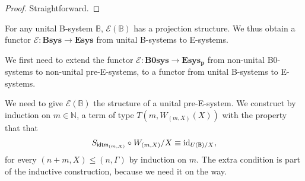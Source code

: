 \begin{proof}
Straightforward.
\end{proof}

\begin{defn}
For any unital B-system $\mathbb{B}$, $\mathcal{E}(\mathbb{B})$ has a
projection structure. We thus obtain a functor 
$\mathcal{E}:\mathbf{Bsys}\to\mathbf{Esys}$ from unital B-systems to E-systems.
\end{defn}

\begin{constr}
We first need to extend the functor $\mathcal{E}:\mathbf{B0sys}\to\mathbf{Esys_p}$
from non-unital B0-systems to non-unital pre-E-systems, to a functor from
unital B-systems to E-systems.

We need to give $\mathcal{E}(\mathbb{B})$ the structure of a unital
pre-E-system. We construct by induction on $m\in \mathbb{N}$, a term of type 
$T(m,W_{(m,X)}(X))$ with the property that that 
\begin{equation*}
S_{\tfid{(m,X)}}\circ W_{(m,X)}/X\jdeq\catid{U(\mathbb{B})/X},
\end{equation*} 
for every $(n+m,X)\leq (n,\Gamma)$ by induction on $m$. The extra
condition is part of the inductive construction, because we need it on the way.


\end{constr}
